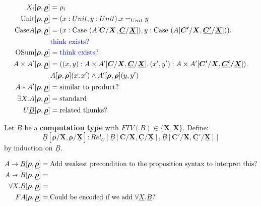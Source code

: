 \documentclass{article}
\begin{document}
\begin{align*}
    X_i[\bm{\rho},\bm{\underline{\rho}}] &= \rho_i\\
    \textrm{Unit} [\bm{\rho},\bm{\underline{\rho}}]&= (x : Unit , y : Unit). x =_{Unit} y\\
    \textrm{Case} A [\bm{\rho},\bm{\underline{\rho}}]&= (x : \textrm{Case } (A[\bm{C}/\bm{X},\bm{\underline{C}}/\bm{\underline{X}}]),
    y : \textrm{Case } (A[\bm{C'}/\bm{X},\bm{\underline{C'}}/\bm{\underline{X}}])). 
    \\
    & \textcolor{blue}{\textrm{think exists?}}\\
    \textrm{OSum} [\bm{\rho},\bm{\underline{\rho}}]&= \textcolor{blue}{\textrm{think exists?}}\\
    A \times A' [\bm{\rho},\bm{\underline{\rho}}]&= ((x,y) : A\times A'[\bm{C}/\bm{X},\bm{\underline{C}}/\bm{\underline{X}}], (x',y') :  A \times A'[\bm{C'}/\bm{X},\bm{\underline{C'}/\bm{\underline{X}}}]).\\
    & A[\bm{\rho},\bm{\underline{\rho}}](x,x')\land A'[\bm{\rho},\bm{\underline{\rho}}](y,y') \\
    A * A' [\bm{\rho},\bm{\underline{\rho}}]&= \textrm{similar to product?}\\
    \exists X . A [\bm{\rho},\bm{\underline{\rho}}]&= \textrm{standard} \\
    U \underline{B} [\bm{\rho},\bm{\underline{\rho}}]&= \textrm{related thunks?}\\
\end{align*}

Let $\underline{B}$ be a \textbf{computation type} with $FTV(\underline{B}) \in \{\bm{X},\bm{\underline{X}}\}$. Define:
\[
  \underline{B}[\bm{\rho}/\bm{X},\bm{\underline{\rho}}/\bm{\underline{X}}] : Rel_{\mathcal{C}}[\underline{B}[\bm{C}/\bm{X},\bm{\underline{C}}/\bm{\underline{X}}], \underline{B}[\bm{C'}/\bm{X},\bm{\underline{C'}/\bm{\underline{X}}}]] 
\] 
by induction on $\underline{B}$. 

\begin{align*}
    A \rightarrow \underline{B}[\bm{\rho},\bm{\underline{\rho}}] &= \textrm{Add weakest precondition to the proposition syntax to interpret this?}\\
    A \mathrel{-\mkern-6mu*} \underline{B}[\bm{\rho},\bm{\underline{\rho}}] &= \\
    \forall X . \underline{B} [\bm{\rho},\bm{\underline{\rho}}]&= \\
    F A[\bm{\rho},\bm{\underline{\rho}}] &= \textrm{Could be encoded if we add } \forall \underline{X} . \underline{B}?\\
\end{align*}
\end{document}
